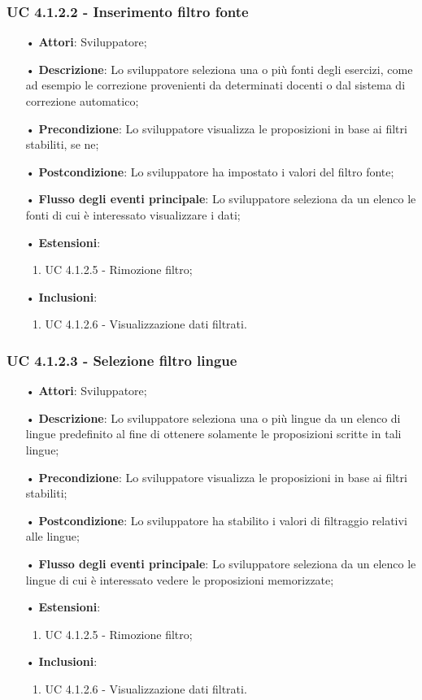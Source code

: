 \subsubsection{UC 4.1.2.2 - Inserimento filtro fonte}
\begin{itemize}
\item[•]\textbf{Attori}: Sviluppatore;
\item[•]\textbf{Descrizione}: Lo sviluppatore seleziona una o più fonti degli esercizi, come ad esempio le correzione provenienti da determinati docenti o dal sistema di correzione automatico;
\item[•]\textbf{Precondizione}: Lo sviluppatore visualizza le proposizioni in base ai filtri stabiliti, se ne;
\item[•]\textbf{Postcondizione}: Lo sviluppatore ha impostato i valori del filtro fonte;
\item[•]\textbf{Flusso degli eventi principale}: Lo sviluppatore seleziona da un elenco le fonti di cui è interessato visualizzare i dati;
\item[•]\textbf{Estensioni}: 
\begin{enumerate}
	\item UC 4.1.2.5 - Rimozione filtro;
\end{enumerate}
\item[•]\textbf{Inclusioni}:
\begin{enumerate}
\item UC 4.1.2.6 - Visualizzazione dati filtrati.
\end{enumerate}
\end{itemize}

\subsubsection{UC 4.1.2.3 -  Selezione filtro lingue}
\begin{itemize}
\item[•]\textbf{Attori}: Sviluppatore;
\item[•]\textbf{Descrizione}: Lo sviluppatore seleziona una o più lingue da un elenco di lingue predefinito al fine di ottenere solamente le proposizioni scritte in tali lingue;
\item[•]\textbf{Precondizione}: Lo sviluppatore visualizza le proposizioni in base ai filtri stabiliti;
\item[•]\textbf{Postcondizione}: Lo sviluppatore ha stabilito i valori di filtraggio relativi alle lingue;
\item[•]\textbf{Flusso degli eventi principale}: Lo sviluppatore seleziona da un elenco le lingue di cui è interessato vedere le proposizioni memorizzate;
\item[•]\textbf{Estensioni}: 
\begin{enumerate}
	\item UC 4.1.2.5 - Rimozione filtro;
\end{enumerate}
\item[•]\textbf{Inclusioni}:
\begin{enumerate}
\item UC 4.1.2.6 - Visualizzazione dati filtrati.
\end{enumerate}
\end{itemize}

